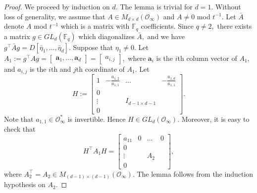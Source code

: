 \documentclass[11pt]{amsart}
\theoremstyle{plain}
\theoremstyle{plain}
\renewcommand{\vec}[1]{\mathbf{#1}}
\theoremstyle{remark}
\theoremstyle{definition}
\newcommand{\FF}{\mathbb{F}}
\newcommand{\cO}{\mathcal{O}}
\begin{document}
\begin{proof}We proceed by induction on $d.$ The lemma is trivial for $d=1.$
Without loss of generality, we  assume that $A \in M_{d\times d}(\cO_{\infty})$ and $A\neq 0 $ mod $t^{-1}.$ Let $\bar{A}$ denote $A$ mod $t^{-1}$ which is a matrix with $\FF_{q}$ coefficients. Since $q\neq 2,$ there exists a matrix $g\in GL_d(\FF_q) $ which diagonalizes $\bar{A},$ and we have  $g^{\intercal}\bar{A}g=D[\bar{\eta}_1,\dots,\bar{\eta}_d].$ Suppose that $\eta_1\neq 0.$ Let $A_1:=g^{\intercal}Ag=\begin{bmatrix}\vec{a}_1,\dots,\vec{a}_d  \end{bmatrix}=\begin{bmatrix}a_{i,j}  \end{bmatrix},$ where $\vec{a}_i$ is the $i$th column vector of $A_1,$ and $a_{i,j}$ is the $i$th and $j$th coordinate of $A_1.$ Let 
\[
H:=\begin{bmatrix}1 &-\frac{a_{1,2}  }{a_{1,1}} & \dots & -\frac{a_{1,d}}{a_{1,1}}
\\
0 &
\\
\vdots &  & I_{{d-1}\times{d-1}}
\\
0
   \end{bmatrix}.
\]
Note that $a_{1,1} \in \cO_{\infty}^*$ is invertible. Hence  $H\in GL_d(\cO_{\infty}).$ Moreover, it is easy to check that 
\[
H^{\intercal}A_1H=\begin{bmatrix}a_{11} &0 & \dots & 0
\\
0 &
\\
\vdots &  & A_2
\\
0
   \end{bmatrix},
\]
where $A_2^{\intercal}=A_2\in M_{{(d-1)}\times {(d-1)}}(\cO_{\infty}).$ The lemma follows from  the induction hypothesis on $A_2.$ 
\end{proof}
\end{document}
